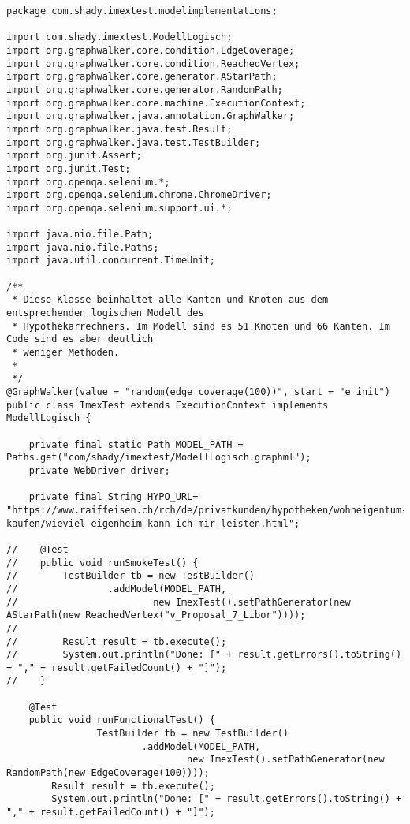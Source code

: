\begin{lstlisting}[caption=ImexTest.java, label=code:gw_selenium]
package com.shady.imextest.modelimplementations;

import com.shady.imextest.ModellLogisch;
import org.graphwalker.core.condition.EdgeCoverage;
import org.graphwalker.core.condition.ReachedVertex;
import org.graphwalker.core.generator.AStarPath;
import org.graphwalker.core.generator.RandomPath;
import org.graphwalker.core.machine.ExecutionContext;
import org.graphwalker.java.annotation.GraphWalker;
import org.graphwalker.java.test.Result;
import org.graphwalker.java.test.TestBuilder;
import org.junit.Assert;
import org.junit.Test;
import org.openqa.selenium.*;
import org.openqa.selenium.chrome.ChromeDriver;
import org.openqa.selenium.support.ui.*;

import java.nio.file.Path;
import java.nio.file.Paths;
import java.util.concurrent.TimeUnit;

/**
 * Diese Klasse beinhaltet alle Kanten und Knoten aus dem entsprechenden logischen Modell des
 * Hypothekarrechners. Im Modell sind es 51 Knoten und 66 Kanten. Im Code sind es aber deutlich
 * weniger Methoden.
 *
 */
@GraphWalker(value = "random(edge_coverage(100))", start = "e_init")
public class ImexTest extends ExecutionContext implements ModellLogisch {

    private final static Path MODEL_PATH = Paths.get("com/shady/imextest/ModellLogisch.graphml");
    private WebDriver driver;

    private final String HYPO_URL= "https://www.raiffeisen.ch/rch/de/privatkunden/hypotheken/wohneigentum-kaufen/wieviel-eigenheim-kann-ich-mir-leisten.html";

//    @Test
//    public void runSmokeTest() {
//        TestBuilder tb = new TestBuilder()
//                .addModel(MODEL_PATH,
//                        new ImexTest().setPathGenerator(new AStarPath(new ReachedVertex("v_Proposal_7_Libor"))));
//
//        Result result = tb.execute();
//        System.out.println("Done: [" + result.getErrors().toString() + "," + result.getFailedCount() + "]");
//    }

    @Test
    public void runFunctionalTest() {
                TestBuilder tb = new TestBuilder()
                        .addModel(MODEL_PATH,
                                new ImexTest().setPathGenerator(new RandomPath(new EdgeCoverage(100))));
        Result result = tb.execute();
        System.out.println("Done: [" + result.getErrors().toString() + "," + result.getFailedCount() + "]");


\end{lstlisting}
